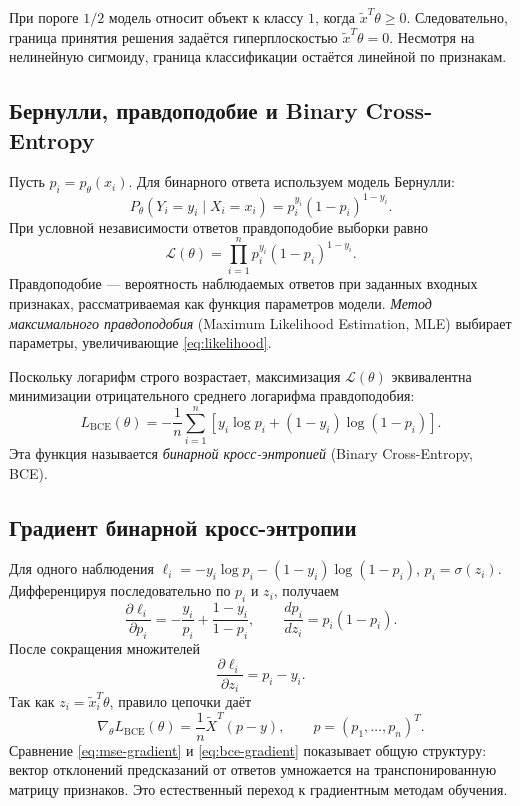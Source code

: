 \documentclass[12pt,a4paper]{article}
\begin{document}
При пороге $1/2$ модель относит объект к классу $1$, когда
$\widetilde x^T\theta\ge0$. Следовательно, граница принятия решения
задаётся гиперплоскостью $\widetilde x^T\theta=0$.
Несмотря на нелинейную сигмоиду, граница классификации
остаётся линейной по признакам.

\subsection{Бернулли, правдоподобие и Binary Cross-Entropy}

Пусть $p_i=p_\theta(x_i)$.
Для бинарного ответа используем модель Бернулли:
\[
    P_\theta(Y_i=y_i\mid X_i=x_i)
    =p_i^{y_i}(1-p_i)^{1-y_i}.
\]
При условной независимости ответов правдоподобие выборки равно
\begin{equation}
    \mathcal L(\theta)
    =\prod_{i=1}^{n}p_i^{y_i}(1-p_i)^{1-y_i}.
    \label{eq:likelihood}
\end{equation}
Правдоподобие --- вероятность наблюдаемых ответов при заданных
входных признаках, рассматриваемая как функция параметров модели.
\emph{Метод максимального правдоподобия} (Maximum Likelihood
Estimation, MLE) выбирает параметры, увеличивающие \eqref{eq:likelihood}.

Поскольку логарифм строго возрастает, максимизация
$\mathcal L(\theta)$ эквивалентна минимизации отрицательного
среднего логарифма правдоподобия:
\begin{equation}
    \boxed{L_{\mathrm{BCE}}(\theta)=
    -\frac1n\sum_{i=1}^{n}
    \left[y_i\log p_i+(1-y_i)\log(1-p_i)\right]}.
    \label{eq:bce}
\end{equation}
Эта функция называется \emph{бинарной кросс-энтропией}
(Binary Cross-Entropy, BCE).

\subsection{Градиент бинарной кросс-энтропии}

Для одного наблюдения
$\ell_i=-y_i\log p_i-(1-y_i)\log(1-p_i)$, $p_i=\sigma(z_i)$.
Дифференцируя последовательно по $p_i$ и $z_i$, получаем
\[
    \frac{\partial\ell_i}{\partial p_i}
    =-\frac{y_i}{p_i}+\frac{1-y_i}{1-p_i},
    \qquad
    \frac{dp_i}{dz_i}=p_i(1-p_i).
\]
После сокращения множителей
\[
    \frac{\partial\ell_i}{\partial z_i}=p_i-y_i.
\]
Так как $z_i=\widetilde x_i^T\theta$, правило цепочки даёт
\begin{equation}
    \boxed{\nabla_\theta L_{\mathrm{BCE}}(\theta)
    =\frac1n\widetilde X^T(p-y)},
    \qquad p=(p_1,\ldots,p_n)^T.
    \label{eq:bce-gradient}
\end{equation}
Сравнение \eqref{eq:mse-gradient} и \eqref{eq:bce-gradient}
показывает общую структуру: вектор отклонений предсказаний
от ответов умножается на транспонированную матрицу признаков.
Это естественный переход к градиентным методам обучения.
\end{document}
